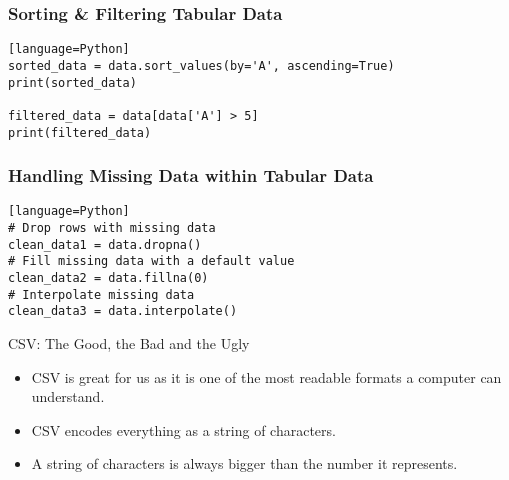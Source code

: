 \documentclass{beamer}
\begin{document}
    \begin{frame}[fragile]
        \frametitle{Sorting \& Filtering Tabular Data}
        \begin{lstlisting}[caption=Sorting data by a column using Pandas][language=Python]
sorted_data = data.sort_values(by='A', ascending=True)
print(sorted_data)

filtered_data = data[data['A'] > 5]
print(filtered_data)
        \end{lstlisting}
    \end{frame}

    \begin{frame}[fragile]
        \frametitle{Handling Missing Data within Tabular Data}
        \begin{lstlisting}[caption=Handling missing data using Pandas][language=Python]
# Drop rows with missing data
clean_data1 = data.dropna()
# Fill missing data with a default value
clean_data2 = data.fillna(0)
# Interpolate missing data
clean_data3 = data.interpolate()
        \end{lstlisting}
    \end{frame}


    \begin{frame}{CSV: The Good, the Bad and the Ugly}
        \begin{itemize}
            \item CSV is great for us as it is one of the most readable formats a computer can understand.
            \item CSV encodes everything as a string of characters.
            \item A string of characters is always bigger than the number it represents.
        \end{itemize}
    \end{frame}
\end{document}
